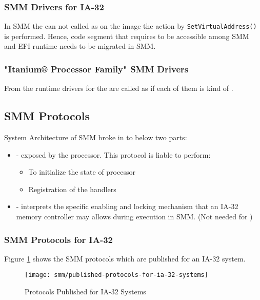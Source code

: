 \subsubsection{SMM Drivers for IA-32}
In SMM the  can not called as on the image the action by \verb|SetVirtualAddress()| is performed. Hence, code segment that requires to be accessible among SMM and EFI runtime needs to be migrated in SMM.

\subsubsection{"Itanium® Processor Family" SMM Drivers}
From  the runtime drivers for the  are called as if each of them is kind of .

\subsection{SMM Protocols}\label{subsection-smm-protocols}
System Architecture of SMM broke in to below two parts:
\begin{itemize}
	\item {} - exposed by the processor. This protocol is liable to perform: 
		\begin{itemize}
			\item To initialize the state of processor
			\item Registration of the handlers
		\end{itemize}
	\item {} - interprets the specific enabling and locking mechanism that an IA-32 memory controller may allows during execution in SMM. (Not needed for )
\end{itemize}

\subsubsection{SMM Protocols for IA-32}
Figure \ref{fig:published-protocols-for-ia-32-systems} shows the SMM protocols which are published for an IA-32 system.
\begin{figure}[!htbp]
	\centering
	\texttt{[image: smm/published-protocols-for-ia-32-systems]}
	\caption{Protocols Published for IA-32 Systems}\label{fig:published-protocols-for-ia-32-systems}
\end{figure}

